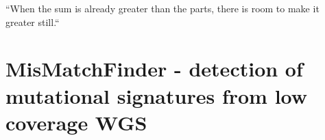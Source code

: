 
\begin{savequote}[65mm]
``When the sum is already greater than the parts, there is room to make it greater still.``
\end{savequote}


\chapter[Mismatchfinder]{MisMatchFinder - detection of mutational signatures from low coverage WGS}
\label{ch:mmf}









